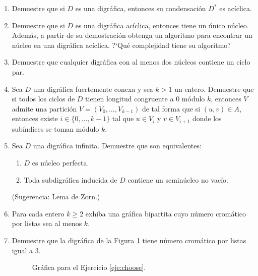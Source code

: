 \documentclass{article}
\begin{document}
\begin{enumerate}
  \item Demuestre que si $D$ es una digr\'afica, entonces su
    condensaci\'on $D^\ast$ es ac\'iclica.

  \item Demuestre que si $D$ es una digr\'afica ac\'iclica, entonces
    tiene un \'unico n\'ucleo.   Adem\'as, a partir de su demostraci\'on
    obtenga un algoritmo para encontrar un n\'ucleo en una digr\'afica
    ac\'iclica.   ?`Qu\'e complejidad tiene su algoritmo?

  \item Demuestre que cualquier digr\'afica con al menos dos n\'ucleos
    contiene un ciclo par.

  \item Sea $D$ una digr\'afica fuertemente conexa y sea $k > 1$ un entero.
    Demuestre que si todos los ciclos de $D$ tienen longitud congruente a
    $0$ m\'odulo $k$, entonces $V$ admite una partici\'on $V = (V_0, \dots,
    V_{k-1})$ de tal forma que si $(u,v) \in A$, entonces existe $i \in
    \{ 0, \dots, k-1 \}$ tal que $u \in V_i$ y $v \in V_{i+1}$ donde los
    sub\'indices se toman m\'odulo $k$.

  \item Sea $D$ una digr\'afica infinita.  Demuestre que son equivalentes:
    \begin{enumerate}
      \item $D$ es n\'ucleo perfecta.

      \item Toda subdigr\'afica inducida de $D$ contiene un semin\'ucleo no
        vac\'io.
    \end{enumerate}
    (Sugerencia: Lema de Zorn.)

  \item Para cada entero $k \ge 2$ exhiba una gr\'afica bipartita cuyo
    n\'umero crom\'atico por listas sea al menos $k$.

  \item Demuestre que la digr\'afica de la Figura \ref{fig:choose} tiene
    n\'umero crom\'atico por listas igual a $3$.
    \label{eje:choose}
    \begin{figure}[ht!]
    \centering
    \caption{Gr\'afica para el Ejercicio \ref{eje:choose}.}
    \label{fig:choose}
    \end{figure}
\end{enumerate}
\end{document}
